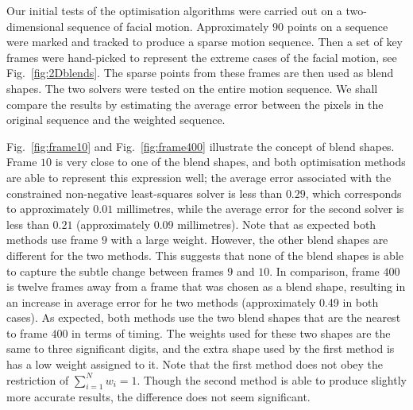 \documentclass[11pt]{report}
\begin{document}
Our initial tests of the optimisation algorithms were carried out on a two-dimensional sequence of facial motion. Approximately $90$ points on a sequence were marked and tracked to produce a sparse motion sequence. Then a set of key frames were hand-picked to represent the extreme cases of the facial motion, see Fig.~\ref{fig:2Dblends}. The sparse points from these frames are then used as blend shapes. The two solvers were tested on the entire motion sequence. We shall compare the results by estimating the average error between the pixels in the original sequence and the weighted sequence.

Fig.~\ref{fig:frame10} and Fig.~\ref{fig:frame400} illustrate the concept of blend shapes. Frame $10$ is very close to one of the blend shapes, and both optimisation methods are able to represent this expression well; the average error associated with the constrained non-negative least-squares solver is less than $0.29$, which corresponds to approximately $0.01$ millimetres, while the average error for the second solver is less than $0.21$ (approximately 0.09 millimetres). Note that as expected both methods use frame $9$ with a large weight. However, the other blend shapes are different for the two methods. This suggests that none of the blend shapes is able to capture the subtle change between frames $9$ and $10$. In comparison, frame $400$ is twelve frames away from a frame that was chosen as a blend shape, resulting in an increase in average error for he two methods (approximately 0.49 in both cases). As expected, both methods use the two blend shapes that are the nearest to frame $400$ in terms of timing. The weights used for these two shapes are the same to three significant digits, and the extra shape used by the first method is has a low weight assigned to it. Note that the first method does not obey the restriction of $\sum_{i=1}^N w_i = 1$. Though the second method is able to produce slightly more accurate results, the difference does not seem significant. 
\end{document}
